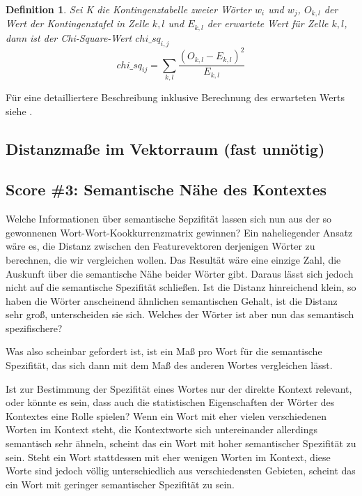 \documentclass[11pt,numbers=noenddot]{scrartcl}
\newtheorem*{defi}{Definition}
\begin{document}
\begin{defi}
Sei K die Kontingenztabelle zweier Wörter $w_i$ und $w_j$, $O_{k,l}$ der Wert der Kontingenztafel in Zelle $k,l$ und $E_{k,l}$ der erwartete Wert für Zelle $k,l$, dann ist der Chi-Square-Wert $chi\_sq_{i,j}$
\begin{equation*}
   chi\_sq_{ij} = \sum_{k,l} { \frac{ (O_{k,l} - E_{k,l})^2} {E_{k,l}}  }
\end{equation*}
\end{defi}

Für eine detailliertere Beschreibung inklusive Berechnung des erwarteten Werts siehe \citet[S. 169ff.]{manning1999}.

\subsection{Distanzmaße im Vektorraum (fast unnötig)}

\subsection{Score \#3: Semantische Nähe des Kontextes}

Welche Informationen über semantische Sepzifität lassen sich nun aus der so gewonnenen Wort-Wort-Kookkurrenzmatrix gewinnen? Ein naheliegender Ansatz wäre es, die Distanz zwischen den Featurevektoren derjenigen Wörter zu berechnen, die wir vergleichen wollen. Das Resultät wäre eine einzige Zahl, die Auskunft über die semantische Nähe beider Wörter gibt. Daraus lässt sich jedoch nicht auf die semantische Spezifität schließen. Ist die Distanz hinreichend klein, so haben die Wörter anscheinend ähnlichen semantischen Gehalt, ist die Distanz sehr groß, unterscheiden sie sich. Welches der Wörter ist aber nun das semantisch spezifischere?

Was also scheinbar gefordert ist, ist ein Maß pro Wort für die semantische Spezifität, das sich dann mit dem Maß des anderen Wortes vergleichen lässt.

Ist zur Bestimmung der Spezifität eines Wortes nur der direkte Kontext relevant, oder könnte es sein, dass auch die statistischen Eigenschaften der Wörter des Kontextes eine Rolle spielen? Wenn ein Wort mit eher vielen verschiedenen Worten im Kontext steht, die Kontextworte sich untereinander allerdings semantisch sehr ähneln, scheint das ein Wort mit hoher semantischer Spezifität zu sein. Steht ein Wort stattdessen mit eher wenigen Worten im Kontext, diese Worte sind jedoch völlig unterschiedlich aus verschiedensten Gebieten, scheint das ein Wort mit geringer semantischer Spezifität zu sein.
\end{document}
